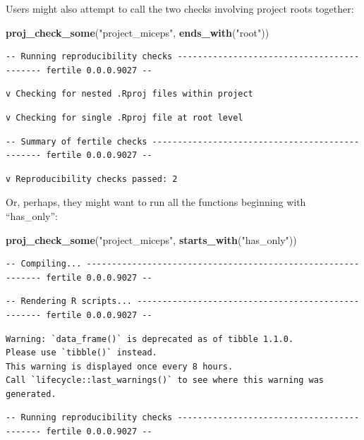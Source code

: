 \documentclass[12pt,twoside]{reedthesis}
\newenvironment{Shaded}{\begin{snugshade}}{\end{snugshade}}
\newcommand{\KeywordTok}[1]{\textcolor[rgb]{0.13,0.29,0.53}{\textbf{#1}}}
\newcommand{\StringTok}[1]{\textcolor[rgb]{0.31,0.60,0.02}{#1}}
\newcommand{\NormalTok}[1]{#1}
\begin{document}
Users might also attempt to call the two checks involving project roots
together:
\begin{Shaded}
\begin{Highlighting}[]
\KeywordTok{proj_check_some}\NormalTok{(}\StringTok{"project_miceps"}\NormalTok{, }\KeywordTok{ends_with}\NormalTok{(}\StringTok{"root"}\NormalTok{))}
\end{Highlighting}
\end{Shaded}
\begin{verbatim}
-- Running reproducibility checks ------------------------------------------- fertile 0.0.0.9027 --
\end{verbatim}
\begin{verbatim}
v Checking for nested .Rproj files within project
\end{verbatim}
\begin{verbatim}
v Checking for single .Rproj file at root level
\end{verbatim}
\begin{verbatim}
-- Summary of fertile checks ------------------------------------------------ fertile 0.0.0.9027 --
\end{verbatim}
\begin{verbatim}
v Reproducibility checks passed: 2
\end{verbatim}
Or, perhaps, they might want to run all the functions beginning with
``has\_only'':
\begin{Shaded}
\begin{Highlighting}[]
\KeywordTok{proj_check_some}\NormalTok{(}\StringTok{"project_miceps"}\NormalTok{, }\KeywordTok{starts_with}\NormalTok{(}\StringTok{"has_only"}\NormalTok{))}
\end{Highlighting}
\end{Shaded}
\begin{verbatim}
-- Compiling... ------------------------------------------------------------- fertile 0.0.0.9027 --
\end{verbatim}
\begin{verbatim}
-- Rendering R scripts... --------------------------------------------------- fertile 0.0.0.9027 --
\end{verbatim}
\begin{verbatim}
Warning: `data_frame()` is deprecated as of tibble 1.1.0.
Please use `tibble()` instead.
This warning is displayed once every 8 hours.
Call `lifecycle::last_warnings()` to see where this warning was generated.
\end{verbatim}
\begin{verbatim}
-- Running reproducibility checks ------------------------------------------- fertile 0.0.0.9027 --
\end{verbatim}
\end{document}
